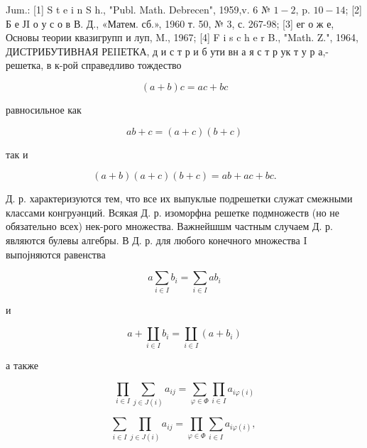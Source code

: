 \documentclass[10pt]{article}
\begin{document}
Jum.: [1] S t e i n S h., "Publ. Math. Debrecen", 1959,v. 6 № $1-2$, p. $10-14$; [2] Б е ЈI о у с о в В. Д., «Матем. сб.», 1960 т. 50, № 3, с. 267-98; [3] ег о ж е, Основы теории квазигрупп и луп, M., 1967; [4] F i s c h e r B., "Math. Z.", 1964, ДИСТРИБУТИВНАЯ РЕIIЕТКА, д и с т р и б ути вн а я с т р ук т у р а,- решетка, в к-рой справедливо тождество



\[

(a+b) c=a c+b c

\]



равносильное как



\[

a b+c=(a+c)(b+c)

\]



так и



\[

(a+b)(a+c)(b+c)=a b+a c+b c .

\]



Д. р. характеризуются тем, что все их выпуклые подрешетки служат смежными классами конгруәнций. Всякая Д. р. изоморфна решетке подмножеств (но не обязательно всех) нек-рого множества. Важнейшшм частным случаем Д. р. являются булевы алгебры. В Д. р. для любого конечного множества I выпојняются равенства



\[

a \sum_{i \in I} b_{i}=\sum_{i \in I} a b_{i}

\]



и



\[

a+\coprod_{i \in I} b_{i}=\coprod_{i \in I}\left(a+b_{i}\right)

\]



а также



\[

\prod_{i \in I} \sum_{j \in J(i)} a_{i j}=\sum_{\varphi \in \Phi} \prod_{i \in I} a_{i \varphi(i)}

\]



\[

\sum_{i \in I} \prod_{j \in J(i)} a_{i j}=\prod_{\varphi \in \Phi} \sum_{i \in I} a_{i \varphi(i)} \text {, }

\]
\end{document}
